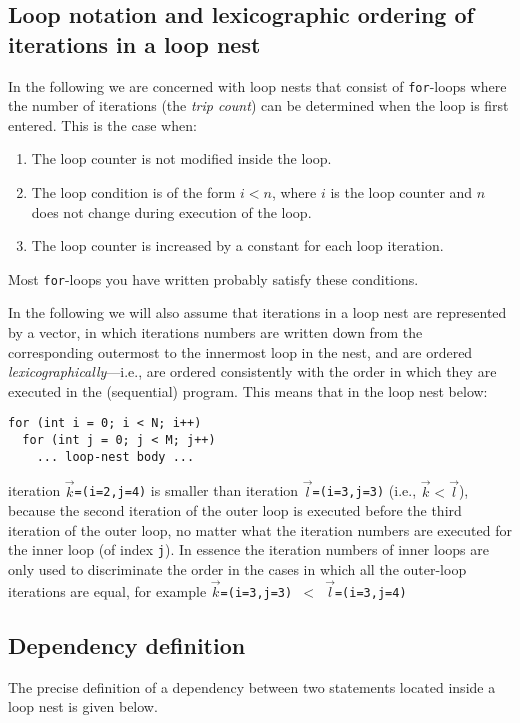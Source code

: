 \subsection{Loop notation and lexicographic ordering of iterations in a loop nest}

In the following we are concerned with loop nests that consist of
\lstinline{for}-loops where the number of iterations (the \emph{trip
  count}) can be determined when the loop is first entered.  This is
the case when:
\begin{enumerate}
\item The loop counter is not modified inside the loop.
\item The loop condition is of the form $i < n$, where $i$ is the loop
  counter and $n$ does not change during execution of the loop.
\item The loop counter is increased by a constant for each loop
  iteration.
\end{enumerate}
Most \lstinline{for}-loops you have written probably satisfy these
conditions.

In the following we will also assume that iterations in a loop
nest are represented by a vector, in which iterations numbers
are written down from the corresponding outermost to the innermost
loop in the nest, and are ordered \emph{lexicographically}---i.e.,
are ordered consistently with the order in which they are executed
in the (sequential) program. This means that in the loop nest below:
\begin{lstlisting}[mathescape=true]
for (int i = 0; i < N; i++)
  for (int j = 0; j < M; j++)
    ... loop-nest body ...
\end{lstlisting}
iteration \texttt{$\vec{k}$=(i=2,j=4)} is smaller than iteration
\texttt{$\vec{l}$=(i=3,j=3)} (i.e., $\vec{k} < \vec{l}$), because the
second iteration of the outer loop is executed before the third
iteration of the outer loop, no matter what the iteration numbers are
executed for the inner loop (of index \texttt{j}).  In essence the
iteration numbers of inner loops are only used to discriminate the
order in the cases in which all the outer-loop iterations are equal,
for example \texttt{$\vec{k}$=(i=3,j=3) $<$
  $\vec{l}$=(i=3,j=4)}

\subsection{Dependency definition}
The precise definition of a dependency between two statements
located inside a loop nest is given below.

